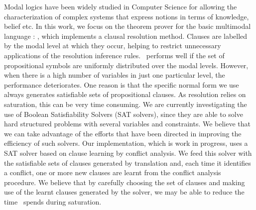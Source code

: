 Modal logics have been widely studied in Computer Science for allowing the
characterization of complex systems that express notions in terms of knowledge,
belief etc. In this work, we focus on the theorem prover for the basic
multimodal language : \ksp, which implements a clausal resolution
method. Clauses are labelled by the modal level at which they occur, helping to
restrict unnecessary applications of the resolution inference rules.  
\ksp\ performs well if the set of propositional symbols are uniformly distributed
over the modal levels. However, when there is a high number of 
variables in just one particular level, the performance deteriorates. One reason
is that the specific normal form we use always generates satisfiable sets of
propositional clauses. As resolution relies on saturation, this can be very time
consuming. We are currently investigating the use of Boolean Satisfiability
Solvers (SAT solvers), since they are able to solve hard structured problems
with several variables and constraints. We believe that
we can take advantage of the efforts that have been directed in improving the
efficiency of such solvers. 
Our implementation, which is work in progress, uses a SAT solver based on clause
learning by conflict analysis. We feed this solver with the satisfiable sets of
clauses generated by translation and, each time it identifies a conflict, one or
more new clauses are learnt from the conflict analysis procedure. We believe
that by carefully choosing the set of clauses and making use of the learnt
clauses generated by the solver, we may be able to reduce the time \ksp\ spends
during saturation. 


